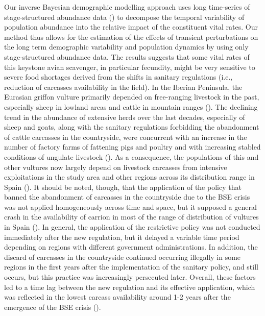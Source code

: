 \documentclass[12pt]{article}
\begin{document}
Our inverse Bayesian demographic modelling approach uses long time-series of stage-structured abundance data (\cite{Wood1994,Gross2002}) to decompose the temporal variability of population abundance into the relative impact of the constituent vital rates. Our method thus allows for the estimation of the effects of transient perturbations on the long term demographic variability and population dynamics by using only stage-structured abundance data. The results suggests that some vital rates of this keystone avian scavenger, in particular fecundity, might be very sensitive to severe food shortages derived from the shifts in sanitary regulations (i.e., reduction of carcasses availability in the field). In the Iberian Peninsula, the Eurasian griffon vulture primarily depended on free-ranging livestock in the past, especially sheep in lowland areas and cattle in mountain ranges (\cite{Donazar1993}). The declining trend in the abundance of extensive herds over the last decades, especially of sheep and goats, along with the sanitary regulations forbidding the abandonment of cattle carcasses in the countryside, were concurrent with an increase in the number of factory farms of fattening pigs and poultry and with increasing stabled conditions of ungulate livestock (\cite{Blanco2014}). As a consequence, the populations of this and other vultures now largely depend on livestock carcasses from intensive exploitations in the study area and other regions across its distribution range in Spain (\cite{Camina2006,Donazar2010,Blanco2019}). It should be noted, though, that the application of the policy that banned the abandonment of carcasses in the countryside due to the BSE crisis was not applied homogeneously across time and space, but it supposed a general crash in the availability of carrion in most of the range of distribution of vultures in Spain (\cite{Donazar2009b,Margalida2010}). In general, the application of the restrictive policy was not conducted immediately after the new regulation, but it delayed a variable time period depending on regions with different government administrations. In addition, the discard of carcasses in the countryside continued occurring illegally in some regions in the first years after the implementation of the sanitary policy, and still occurs, but this practice was increasingly persecuted later. Overall, these factors led to a time lag between the new regulation and its effective application, which was reflected in the lowest carcass availability around 1-2 years after the emergence of the BSE crisis (\cite{Donazar2009b,Blanco2014}).\\
\end{document}
